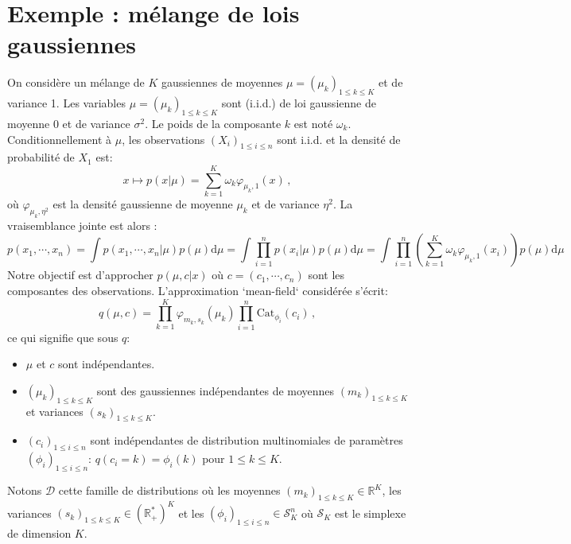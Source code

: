 \documentclass[a4paper,10pt,fleqn]{article}
\newcommand{\1}{\ensuremath{\mathbbm{1}}}
\begin{document}
\section*{Exemple : m\'elange de lois gaussiennes}
On consid\`ere un m\'elange de $K$ gaussiennes de moyennes $\mu = (\mu_k)_{1\leqslant k \leqslant K}$ et de variance 1. Les variables $\mu = (\mu_k)_{1\leqslant k \leqslant K}$ sont (i.i.d.) de loi  gaussienne de moyenne 0 et de variance $\sigma^2$. Le poids de la composante $k$ est not\'e $\omega_k$. Conditionnellement \`a $\mu$, les observations $(X_i)_{1\leqslant i\leqslant n}$ sont i.i.d. et la densit\'e de probabilit\'e de $X_1$ est:
$$
x\mapsto p(x|\mu) = \sum_{k=1}^K \omega_k \varphi_{\mu_k,1}(x)\,,
$$
o\`u $\varphi_{\mu_k,\eta^2}$ est la densit\'e gaussienne de moyenne $\mu_k$ et de variance $\eta^2$. La vraisemblance jointe est alors :
$$
p(x_1,\cdots,x_n) = \int p(x_1,\cdots,x_n|\mu) p(\mu) \mathrm{d} \mu = \int \prod_{i=1}^n p(x_i|\mu) p(\mu) \mathrm{d} \mu = \int \prod_{i=1}^n \left(\sum_{k=1}^K \omega_k \varphi_{\mu_k,1}(x_i)\right) p(\mu) \mathrm{d} \mu
$$
Notre objectif est d'approcher $p(\mu,c|x)$ o\`u $c = (c_1,\cdots,c_n)$ sont les composantes des observations.  L'approximation `mean-field` consid\'er\'ee s'\'ecrit:
$$
q(\mu,c) = \prod_{k=1}^K \varphi_{m_k,s_k}(\mu_k)\prod_{i=1}^n \mathrm{Cat}_{\phi_i}(c_i)\,, 
$$
ce qui signifie que sous $q$:
\begin{itemize}
\item $\mu$ et $c$ sont ind\'ependantes.
\item $(\mu_{k})_{1\leqslant k \leqslant K}$ sont des gaussiennes ind\'ependantes de moyennes $(m_{k})_{1\leqslant k \leqslant K}$ et variances $(s_{k})_{1\leqslant k \leqslant K}$.
\item $(c_{i})_{1\leqslant i \leqslant n}$ sont ind\'ependantes de distribution multinomiales de param\`etres $(\phi_i)_{1\leqslant i \leqslant n}$: $q(c_i=k) = \phi_i(k)$ pour $1\leqslant k \leqslant K$. 
\end{itemize}
Notons $\mathcal{D}$ cette famille de distributions o\`u les moyennes $(m_{k})_{1\leqslant k \leqslant K}\in \mathbb{R}^K$, les variances $(s_{k})_{1\leqslant k \leqslant K}\in (\mathbb{R}_+^*)^K$ et les  $(\phi_i)_{1\leqslant i \leqslant n}\in \mathcal{S}_K^n$ o\`u $\mathcal{S}_K$ est le simplexe de dimension $K$. 
\end{document}
